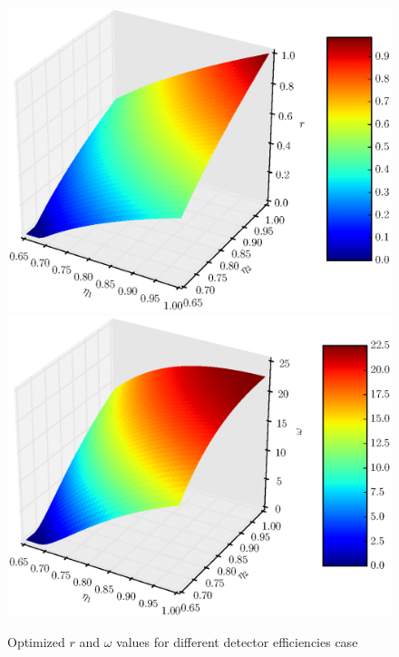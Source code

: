 \documentclass[%
master,         %
subf,           %
href,           %
colorlinks=true %
]{disser}
\numberwithin{equation}{section}
\numberwithin{figure}{section}
\begin{document}
\begin{figure}[h]
\includegraphics[scale=0.7]{r3d.eps}
\includegraphics[scale=0.7]{omega3d.eps}
\caption{Optimized $r$ and $\omega$ values for different detector efficiencies case}
\label{fig:psi_opt_3d}
\end{figure}
\end{document}
